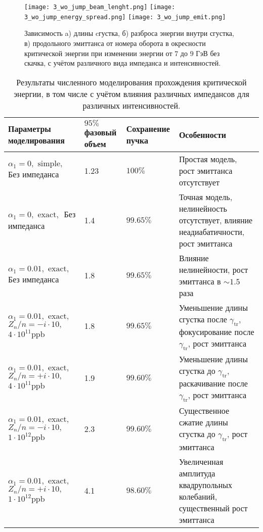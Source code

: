 \begin{figure} [h!]
   \texttt{[image: 3\_wo\_jump\_beam\_lenght.png]}
   \texttt{[image: 3\_wo\_jump\_energy\_spread.png]}
   \texttt{[image: 3\_wo\_jump\_emit.png]}
   \caption{Зависимость a) длины cгустка, б) разброса энергии внутри сгустка, в) продольного эмиттанса от номера оборота в окресности критической энергии при изменении энергии от $7$ до $9$ ГэВ без скачка, с учётом различного вида импеданса и интенсивностей.}
   \label{fig:3_wo_jump}
\end{figure}

\begin{table}
\begin{center}
\begin{tabular}{| m{4cm} | M{2.5cm} | M{2.5cm} | m{6.6cm} |}
\hline 
Параметры моделирования & $95 \%$ фазовый объем & Сохранение пучка & Особенности \\
\hline
$\alpha_1=0, \text { simple, }$ Без импеданса & 1.23 & $100\%$ & Простая модель, рост эмиттанса отсутствует \\
\hline 
$\alpha_1=0, \text { exact, }$ Без импеданса & 1.4 & $99.65\%$ & Точная модель, нелинейность отсутствует, влияние неадиабатичности, рост эмиттанса \\
\hline 
$\alpha_1=0.01, \text { exact, }$ Без импеданса & 1.8 & $99.65\%$ & Влияние нелинейности, рост эмиттанса в $\sim 1.5$ раза \\
\hline 
$
 \alpha_1=0.01, \text { exact, }$
$ Z_n / n=-i \cdot 10, \quad$
$4 \cdot 10^{11} \mathrm{ppb} $
 & 1.8 & $99.65\%$ & Уменьшение длины сгустка после $\gamma_{\mathrm{tr}}$, фокусирование после $\gamma_{\mathrm{tr}}$, рост эмиттанса \\
\hline 
$
\alpha_1=0.01, \text { exact, }$ 
$ Z_n / n=+i \cdot 10, \quad$
$4 \cdot 10^{11} \mathrm{ppb} $
 & 1.9 & $99.60\%$ & Уменьшение длины сгустка до $\gamma_{\mathrm{tr}}$, раскачивание после $\gamma_{\mathrm{tr}}$, рост эмиттанса \\
\hline 
$
\alpha_1=0.01, \text { exact, } $ 
$Z_n / n=-i \cdot 10, \quad$
$1 \cdot 10^{12} \mathrm{ppb}$
 & 2.3 & $99.60\%$ & Существенное сжатие длины сгустка до $\gamma_{\mathrm{tr}}$, рост эмиттанса \\
\hline 
$
 \alpha_1=0.01, \text { exact, } $ 
$ Z_n / n=+i \cdot 10, \quad$
$ 1 \cdot 10^{12} \mathrm{ppb}$
 & 4.1 & $98.60\%$ & Увеличенная амплитуда квадрупольных колебаний, существенный рост эмиттанса \\
\hline
\end{tabular}
\end{center}
\caption{Результаты численного моделирования прохождения критической энергии, в том числе с учётом влияния различных импедансов для различных интенсивностей.}
\end{table}


